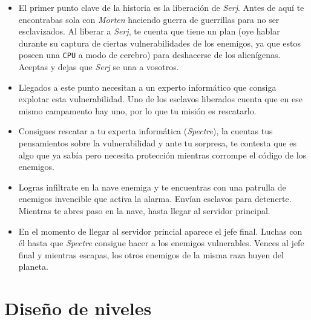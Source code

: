 \documentclass[twoside]{article}
\begin{document}
\begin{itemize}
\item El primer punto clave de la historia es la liberación de \textit{Serj}. Antes de aquí te encontrabas sola con \textit{Morten} haciendo guerra de guerrillas para no ser esclavizados. Al liberar a \textit{Serj}, te cuenta que tiene un plan (oye hablar durante su captura de ciertas vulnerabilidades de los enemigos, ya que estos poseen una \texttt{CPU} a modo de cerebro) para deshacerse de los alienígenas. Aceptas y dejas que \textit{Serj} se una a vosotros.
\item Llegados a este punto necesitan a un experto informático que consiga explotar esta vulnerabilidad. Uno de los esclavos liberados cuenta que en ese mismo campamento hay uno, por lo que tu misión es rescatarlo. 
\item Consigues rescatar a tu experta informática (\textit{Spectre}), la cuentas tus pensamientos sobre la vulnerabilidad y ante tu sorpresa, te contesta que es algo que ya sabía pero necesita protección mientras corrompe el código de los enemigos. 
\item Logras infiltrate en la nave enemiga y te encuentras con una patrulla de enemigos invencible que activa la alarma. Envían esclavos para detenerte. Mientras te abres paso en la nave, hasta llegar al servidor principal. 
\item En el momento de llegar al servidor princial aparece el jefe final. Luchas con él hasta que \textit{Spectre} consigue hacer a los enemigos vulnerables. Vences al jefe final y mientras escapas, los otros enemigos de la misma raza huyen del planeta. 
\end{itemize}

\newpage
\pagestyle{insection}
\section{Diseño de niveles}
\end{document}
